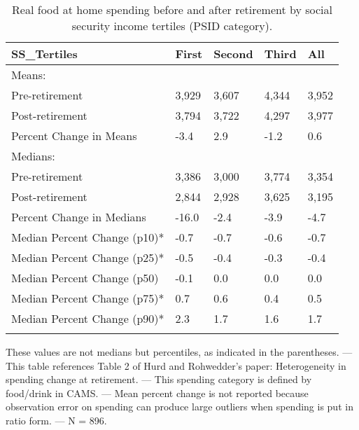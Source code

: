 \begin{table}[tbp] \centering
{}

\caption{Real food at home spending before and after retirement by social security income tertiles (PSID category).}
\begin{tabularx}{\textwidth}{lCCCC}

\toprule
{SS\_Tertiles}&{First}&{Second}&{Third}&{All} \tabularnewline
\midrule\addlinespace[1.5ex]
Means:&&&& \tabularnewline
\midrule Pre-retirement&3,929&3,607&4,344&3,952 \tabularnewline
Post-retirement&3,794&3,722&4,297&3,977 \tabularnewline
Percent Change in Means&-3.4&2.9&-1.2&0.6 \tabularnewline
\midrule Medians:&&&& \tabularnewline
\midrule Pre-retirement&3,386&3,000&3,774&3,354 \tabularnewline
Post-retirement&2,844&2,928&3,625&3,195 \tabularnewline
Percent Change in Medians&-16.0&-2.4&-3.9&-4.7 \tabularnewline
Median Percent Change (p10)*&-0.7&-0.7&-0.6&-0.7 \tabularnewline
Median Percent Change (p25)*&-0.5&-0.4&-0.3&-0.4 \tabularnewline
Median Percent Change (p50)&-0.1&0.0&0.0&0.0 \tabularnewline
Median Percent Change (p75)*&0.7&0.6&0.4&0.5 \tabularnewline
Median Percent Change (p90)*&2.3&1.7&1.6&1.7 \tabularnewline
\bottomrule \addlinespace[1.5ex]

\end{tabularx}
\begin{flushleft}
\footnotesize *These values are not medians but percentiles, as indicated in the parentheses. \linebreak --- \linebreak This table references Table 2 of Hurd and Rohwedder's paper: Heterogeneity in spending change at retirement. \linebreak --- \linebreak This spending category is defined by food/drink in CAMS. \linebreak --- \linebreak Mean percent change is not reported because observation error on spending can produce large outliers when spending is put in ratio form. \linebreak --- \linebreak N = 896.
\end{flushleft}
\end{table}
